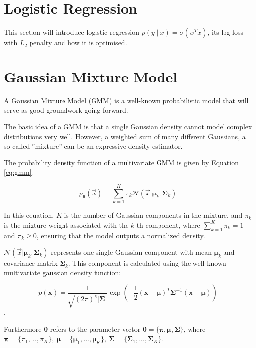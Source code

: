 \section{Logistic Regression}
\label{sec:logistic-regression}

This section will introduce logistic regression $p(y \mid x) = \sigma(w^T x)$, its log loss with $L_2$ penalty and how it is optimised.

\section{Gaussian Mixture Model}
\label{sec:gmm}

A Gaussian Mixture Model (GMM) \cite{ml_book} is a well-known probabilistic model that will serve as good groundwork 
going forward.

The basic idea of a GMM is that a single Gaussian density cannot model complex distributions very well.
However, a weighted sum of many different Gaussians, a so-called ''mixture'' can be an expressive density estimator.

The probability density function of a multivariate GMM is given by Equation \ref{eq:gmm}.

\begin{equation}
    p_{\boldsymbol{\theta}}(\vec x) =  \sum_{k=1}^K \pi_k \mathcal{N}(\vec x|\boldsymbol{\mu}_k, \boldsymbol{\Sigma}_k) 
    \label{eq:gmm}
\end{equation}

In this equation, $K$ is the number of Gaussian components in the mixture, and $\pi_k$ is the mixture weight associated with the $k$-th component, where $\sum_{k=1}^K \pi_k = 1$ and $\pi_k \geq 0$, ensuring that the model 
outputs a normalized density. 

$\mathcal{N}(\vec x|\boldsymbol{\mu}_k, \boldsymbol{\Sigma}_k)$ represents one single Gaussian component with mean $\boldsymbol{\mu}_k$ and 
covariance matrix $\boldsymbol{\Sigma}_k$. This component is calculated using the well known multivariate gaussian density function:

\begin{equation}
    p(\mathbf{x}) = \frac{1}{\sqrt{(2\pi)^n |\boldsymbol{\Sigma}|}} \exp\left(-\frac{1}{2} (\mathbf{x} - \boldsymbol{\mu})^T \boldsymbol{\Sigma}^{-1} (\mathbf{x} - \boldsymbol{\mu})\right)
\end{equation}. 

Furthermore $\boldsymbol{\theta}$ refers to the parameter vector $\boldsymbol{\theta} = \{\boldsymbol{\pi}, \boldsymbol{\mu}, \boldsymbol{\Sigma}\}$, where $\boldsymbol{\pi} = \{ \pi_1, ... , \pi_K \}, \ \boldsymbol{\mu} = \{ \boldsymbol{\mu}_1, ... , \boldsymbol{\mu}_K \}, \ \boldsymbol{\Sigma} = \{ \boldsymbol{\Sigma}_1, ... , \boldsymbol{\Sigma}_K \}$.

